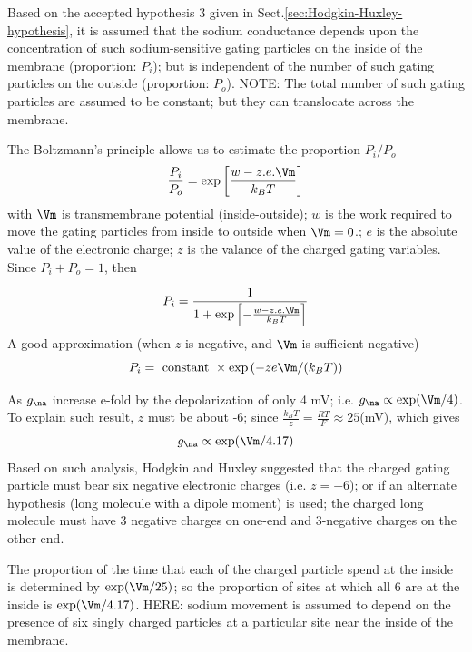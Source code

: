 Based on the accepted hypothesis 3 given in
Sect.\ref{sec:Hodgkin-Huxley-hypothesis}, it is assumed that the sodium
conductance depends upon the concentration of such sodium-sensitive gating
particles on the inside of the membrane (proportion: $P_i$); but is independent
of the number of such gating particles on the outside (proportion: $P_o$). NOTE:
The total number of such gating particles are assumed to be constant; but they
can translocate across the membrane.

The Boltzmann's principle allows us to estimate the proportion $P_i/P_o$
\begin{equation}
\frac{P_i}{P_o} = \exp \left[ \frac{w - z.e.\Vm}{k_BT} \right]
\end{equation}
with $\Vm$ is transmembrane potential (inside-outside); $w$ is the work required
to move the gating particles from inside to outside when $\Vm = 0$.; $e$ is the
absolute value of the electronic charge; $z$ is the valance of the charged
gating variables. Since $P_i + P_o = 1$, then

\begin{equation}
P_i = \frac{1}{1 + \exp\left[ - \frac{w - z.e.\Vm}{k_BT} \right]}
\end{equation}
A good approximation (when $z$ is negative, and $\Vm$ is sufficient negative)
\begin{equation}
P_i = \text{ constant } \times \exp\left( -ze\Vm/(k_BT) \right)
\end{equation}

As $g_\na$ increase e-fold by the depolarization of only 4 mV; i.e.  $g_\na
\propto \exp(\Vm/4)$. To explain such result, $z$ must be about -6; since
$\frac{k_BT}{z}=\frac{RT}{F} \approx 25 $(mV), which gives
\begin{equation}
g_\na \propto \exp(\Vm/4.17)
\end{equation}
Based on such analysis, Hodgkin and Huxley suggested that the charged gating
particle must bear six negative electronic charges (i.e. $z=-6$); or if an alternate hypothesis (long molecule
with a dipole moment) is used; the charged long molecule must have 3 negative
charges on one-end and 3-negative charges on the other end.

The proportion of the time that each of the charged particle spend at the inside
is determined by $\exp(\Vm/25)$; so the proportion of sites at which all 6 are
at the inside is $\exp(\Vm/4.17)$.
HERE: sodium movement is assumed to depend on the presence of six singly charged
particles at a particular site near the inside of the membrane.

